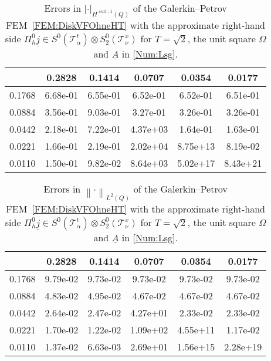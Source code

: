 \documentclass[a4paper,11pt]{article}
\newcommand{\cu}{\operatorname{curl}}
\renewcommand{\vec}[1]{\underline{#1}}
\newcommand{\abs}[1]{\left\lvert{#1}\right\rvert}
\newcommand{\norm}[1]{{\left\lVert{#1}\right\rVert}}
\begin{document}
\begin{table}[ht!]
	\begin{center}
		\begin{footnotesize}\begin{tabular}{r||c|c|c|c|c}
				\diagbox{$h_x$}{\vspace*{-.1cm}$h_t$} & 0.2828 & 0.1414 & 0.0707 & 0.0354 & 0.0177   \\
				\hline\hline
				0.1768 & 6.68e-01 & 6.55e-01 & 6.52e-01 & 6.52e-01 & 6.51e-01 \\
				0.0884 & 3.56e-01 & 9.03e-01 & 3.27e-01 & 3.26e-01 & 3.26e-01 \\
				0.0442 & 2.18e-01 & 7.22e-01 & 4.37e+03 & 1.64e-01 & 1.63e-01 \\
				0.0221 & 1.66e-01 & 2.19e-01 & 2.02e+04 & 8.75e+13 & 8.19e-02 \\
				0.0110 & 1.50e-01 & 9.82e-02 & 8.64e+03 & 5.02e+17 & 8.43e+21
		\end{tabular}\end{footnotesize}
		\caption{Errors in $\abs{\cdot}_{H^{\cu;1}(Q)}$ of the Galerkin--Petrov FEM~\eqref{FEM:DiskVFOhneHT} with the approximate right-hand side $\Pi_h^0 \vec j \in S^0(\mathcal T^t_\alpha) \otimes S_2^0(\mathcal T^x_\nu)$ for $T=\sqrt{2}$, the unit square $\Omega$ and $\vec A$ in \eqref{Num:Lsg}.} \label{Num:Tab:OhneConstH1Curl}
	\end{center}
\end{table}

\begin{table}[ht!]
	\begin{center}
		\begin{footnotesize}\begin{tabular}{r||c|c|c|c|c}
				\diagbox{$h_x$}{\vspace*{-.1cm}$h_t$} & 0.2828 & 0.1414 & 0.0707 & 0.0354 & 0.0177   \\
				\hline\hline
				0.1768 & 9.79e-02 & 9.73e-02 & 9.73e-02 & 9.73e-02 & 9.73e-02 \\
				0.0884 & 4.83e-02 & 4.95e-02 & 4.67e-02 & 4.67e-02 & 4.67e-02 \\
				0.0442 & 2.64e-02 & 2.47e-02 & 4.27e+01 & 2.33e-02 & 2.33e-02 \\
				0.0221 & 1.70e-02 & 1.22e-02 & 1.09e+02 & 4.55e+11 & 1.17e-02 \\
				0.0110 & 1.37e-02 & 6.63e-03 & 2.69e+01 & 1.56e+15 & 2.28e+19
		\end{tabular}\end{footnotesize}
		\caption{Errors in $\norm{\cdot}_{L^2(Q)}$ of the Galerkin--Petrov FEM~\eqref{FEM:DiskVFOhneHT} with the approximate right-hand side $\Pi_h^0 \vec j \in S^0(\mathcal T^t_\alpha) \otimes S_2^0(\mathcal T^x_\nu)$ for $T=\sqrt{2}$, the unit square $\Omega$ and $\vec A$ in \eqref{Num:Lsg}.} \label{Num:Tab:OhneConstL2}
	\end{center}
\end{table}
\end{document}
